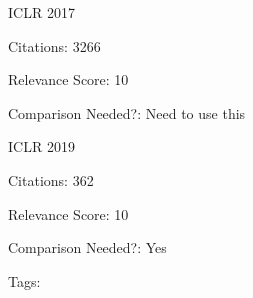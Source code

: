\documentclass[11pt]{article}
\begin{document}
\noindent ICLR 2017

\noindent Citations: 3266

\noindent Relevance Score: 10

\noindent Comparison Needed?: Need to use this


\vspace{2cm} 

\noindent ICLR 2019

\noindent Citations: 362

\noindent Relevance Score: 10

\noindent Comparison Needed?: Yes

\noindent Tags: 
\end{document}
